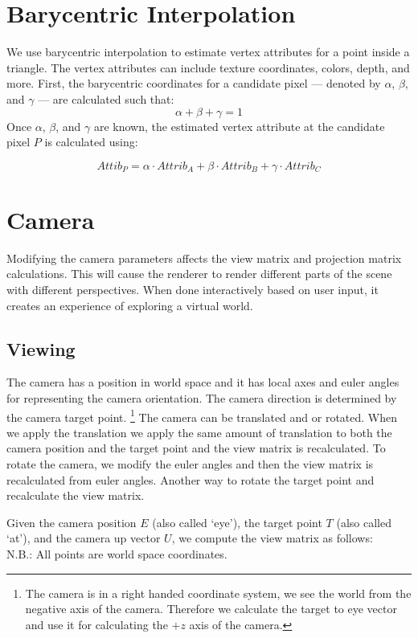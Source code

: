 \section{Barycentric Interpolation}
We use barycentric interpolation to estimate vertex attributes for a point inside a triangle.  
The vertex attributes can include texture coordinates, colors,  depth, and more.
First, the barycentric coordinates for a candidate pixel --- denoted by $\alpha$, $\beta$, and $\gamma$ --- are calculated such that:
\[
\alpha + \beta + \gamma = 1
\]
Once $\alpha$, $\beta$, and $\gamma$ are known, the estimated vertex attribute at the candidate pixel $P$ is calculated using:

\begin{equation}
Attib_P = \alpha \cdot Attrib_A + \beta \cdot Attrib_B + \gamma \cdot Attrib_C
\end{equation}


\section{Camera}
Modifying the camera parameters affects the view matrix and projection matrix calculations. This will cause the renderer to render different parts of the scene with different perspectives. When done interactively based on user input, it creates an experience of exploring a virtual world.
\subsection{Viewing}
The camera has a position in world space and it has local axes and euler angles for representing the camera orientation. The camera direction is determined by the camera target point. \footnote{The camera is in a right handed coordinate system, we see the world from the negative axis of the camera. Therefore we calculate the target to eye vector and use it for calculating the $+z$ axis of the camera.} The camera can be translated and or rotated.  When we apply the translation we apply the same amount of translation to both the camera position and the target point and the view matrix is recalculated. To rotate the camera, we modify the euler angles and then the view matrix is recalculated from euler angles. Another way to rotate the target point and recalculate the view matrix.

Given the camera position $E$ (also called `eye'), the target point $T$ (also called `at'), and the camera up vector $U$, we compute the view matrix as follows: \\
N.B.: All points are world space coordinates.\\

